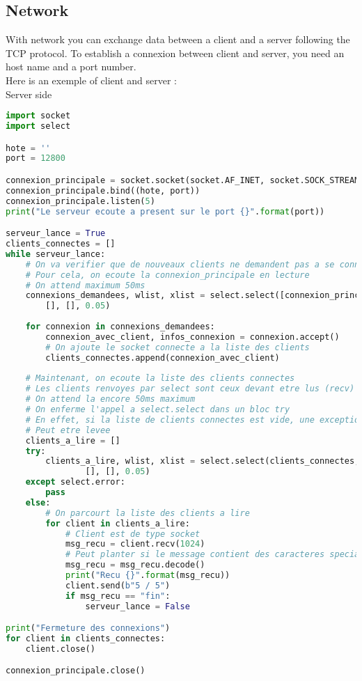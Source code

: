 \documentclass[a4paper, 12pt, titlepage]{scrartcl} %
\begin{document}
\subsection{Network}
With network you can exchange data between a client and a server following the TCP protocol. To establish a connexion between client and server, you need an host name and a port number. \\
Here is an exemple of client and server : \\
Server side
\begin{lstlisting}[language=Python]
import socket
import select

hote = ''
port = 12800

connexion_principale = socket.socket(socket.AF_INET, socket.SOCK_STREAM)
connexion_principale.bind((hote, port))
connexion_principale.listen(5)
print("Le serveur ecoute a present sur le port {}".format(port))

serveur_lance = True
clients_connectes = []
while serveur_lance:
    # On va verifier que de nouveaux clients ne demandent pas a se connecter
    # Pour cela, on ecoute la connexion_principale en lecture
    # On attend maximum 50ms
    connexions_demandees, wlist, xlist = select.select([connexion_principale],
        [], [], 0.05)
    
    for connexion in connexions_demandees:
        connexion_avec_client, infos_connexion = connexion.accept()
        # On ajoute le socket connecte a la liste des clients
        clients_connectes.append(connexion_avec_client)
    
    # Maintenant, on ecoute la liste des clients connectes
    # Les clients renvoyes par select sont ceux devant etre lus (recv)
    # On attend la encore 50ms maximum
    # On enferme l'appel a select.select dans un bloc try
    # En effet, si la liste de clients connectes est vide, une exception
    # Peut etre levee
    clients_a_lire = []
    try:
        clients_a_lire, wlist, xlist = select.select(clients_connectes,
                [], [], 0.05)
    except select.error:
        pass
    else:
        # On parcourt la liste des clients a lire
        for client in clients_a_lire:
            # Client est de type socket
            msg_recu = client.recv(1024)
            # Peut planter si le message contient des caracteres speciaux
            msg_recu = msg_recu.decode()
            print("Recu {}".format(msg_recu))
            client.send(b"5 / 5")
            if msg_recu == "fin":
                serveur_lance = False

print("Fermeture des connexions")
for client in clients_connectes:
    client.close()

connexion_principale.close()
\end{lstlisting}
\end{document}

